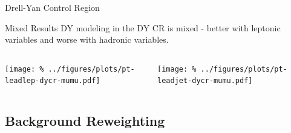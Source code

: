 \documentclass[aspectratio=169]{beamer}
\begin{document}
\begin{frame}{Drell-Yan Control Region}
  \begin{block}{Mixed Results}
    DY modeling in the DY CR is mixed - better with leptonic variables and worse with hadronic variables.
  \end{block}
  \vfill
  \begin{columns}
    \begin{column}{0.35\textwidth}
      \texttt{[image: \%
        ../figures/plots/pt-leadlep-dycr-mumu.pdf]}
    \end{column}
    \begin{column}{0.35\textwidth}
      \texttt{[image: \%
        ../figures/plots/pt-leadjet-dycr-mumu.pdf]}
    \end{column}
    \begin{column}{0.3\textwidth}
      \centering
      \resizebox{\columnwidth}{!}{%
      }
    \end{column}
  \end{columns}
\end{frame}

\subsection{Background Reweighting}
\end{document}
